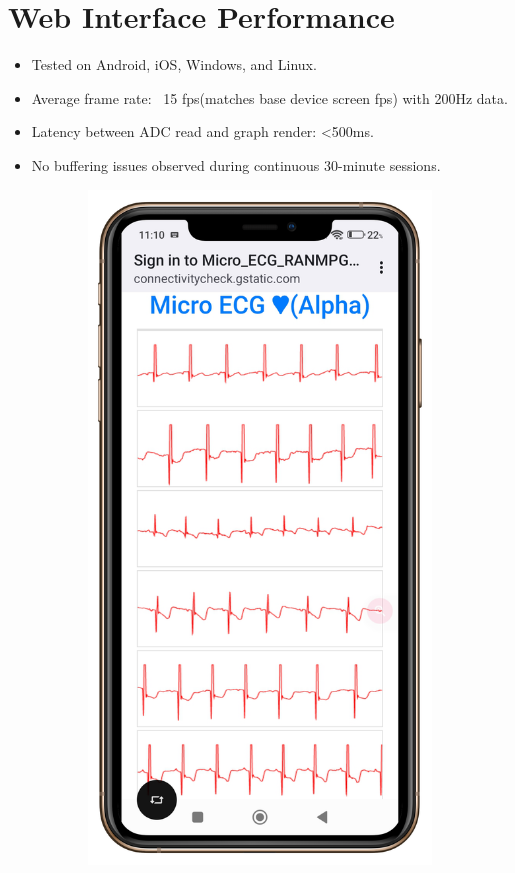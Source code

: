 \section{Web Interface Performance}
\begin{itemize}
    \item Tested on Android, iOS, Windows, and Linux.
    \item Average frame rate: ~15 fps(matches base device screen fps) with 200Hz data.
    \item Latency between ADC read and graph render: <500ms.
    \item No buffering issues observed during continuous 30-minute sessions.
\end{itemize}

\begin{figure}[h]
    \centering
    \begin{subfigure}[b]{0.45\textwidth}
        \includegraphics[width=\textwidth]{images/result-portrait.png}

\end{subfigure}
\end{figure}
